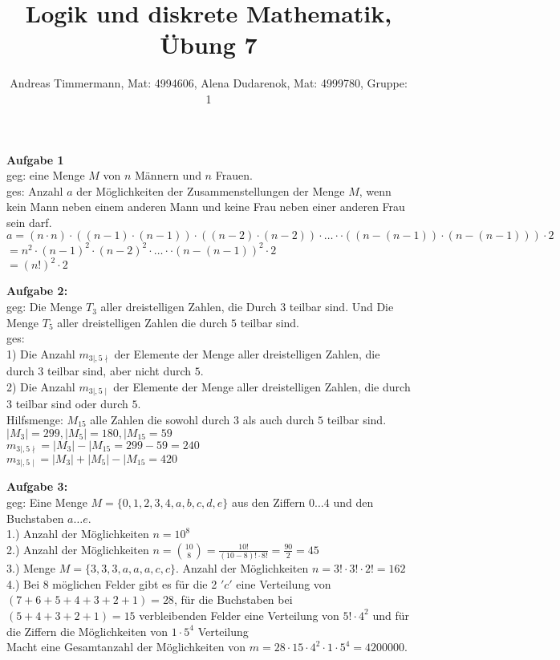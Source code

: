 \documentclass[a4paper]{scrartcl}
\title{Logik und diskrete Mathematik, Übung 7}
\author{Andreas Timmermann, Mat: 4994606, Alena Dudarenok, Mat: 4999780, Gruppe: 1}
\begin{document}
	\maketitle
	\begin{flushleft}
		\textbf{Aufgabe 1}\\
		geg: eine Menge $M$ von $n$ Männern und $n$ Frauen.\\
		ges: Anzahl $a$ der Möglichkeiten der Zusammenstellungen der Menge $M$, wenn kein Mann neben einem anderen Mann und keine Frau neben einer anderen Frau sein darf.\\[1em]
		
		$a = (n\cdot n)\cdot((n-1)\cdot (n-1))\cdot((n-2)\cdot (n-2))\cdot \dots\cdot\cdot((n-(n-1))\cdot (n-(n-1)))\cdot 2$\\
		$= n^2\cdot(n-1)^2\cdot(n-2)^2\cdot \dots\cdot\cdot(n-(n-1))^2\cdot 2$\\
		$=(n!)^2\cdot 2$\\
	\end{flushleft}
	\begin{flushleft}
		\textbf{Aufgabe 2:}\\
		geg: Die Menge $T_3$ aller dreistelligen Zahlen, die Durch $3$ teilbar sind. Und Die Menge $T_5$ aller dreistelligen Zahlen die durch $5$ teilbar sind.\\
		ges:\\
		1) Die Anzahl $m_{3\mid,5\nmid}$ der Elemente der Menge aller dreistelligen Zahlen, die durch $3$ teilbar sind, aber nicht durch $5$.\\
		2) Die Anzahl $m_{3\mid,5\mid}$ der Elemente der Menge aller dreistelligen Zahlen, die durch $3$ teilbar sind oder durch $5$.\\[1em]
		Hilfsmenge: $M_{15}$ alle Zahlen die sowohl durch $3$ als auch durch $5$ teilbar sind.\\
		$|M_3|=299, |M_5| = 180, |M_{15} = 59$\\
		$m_{3\mid,5\nmid}=|M_3|-|M_{15} = 299-59=240$\\
		$m_{3\mid,5\mid}=|M_3|+|M_5|-|M_{15}=420$\\[1em]
	\end{flushleft}
	\begin{flushleft}
		\textbf{Aufgabe 3:}\\	
		geg: Eine Menge $M=\{0,1,2,3,4,a,b,c,d,e\}$ aus den Ziffern $0\dots4$ und den Buchstaben $a\dots e$.\\[1em]
		1.) Anzahl der Möglichkeiten $n= 10^8$\\
		2.) Anzahl der Möglichkeiten $n= \binom{10}{8}=\frac{10!}{(10-8)!\cdot 8!}=\frac{90}{2}=45$\\
		3.) Menge $M=\{3,3,3,a,a,a,c,c\}$. Anzahl der Möglichkeiten $n= 3!\cdot 3!\cdot 2!= 162$\\
		4.) Bei $8$ möglichen Felder gibt es für die 2 $'c'$ eine Verteilung von $(7+6+5+4+3+2+1)=28$, für die Buchstaben bei $(5+4+3+2+1)=15$ verbleibenden Felder eine Verteilung von $5!\cdot 4^2$ und für die Ziffern die Möglichkeiten von $1\cdot 5^4$ Verteilung\\
		Macht eine Gesamtanzahl der Möglichkeiten von $m=28\cdot 15\cdot 4^2\cdot 1\cdot 5^4=4200000$.\\[1em]
	\end{flushleft}
\end{document}
